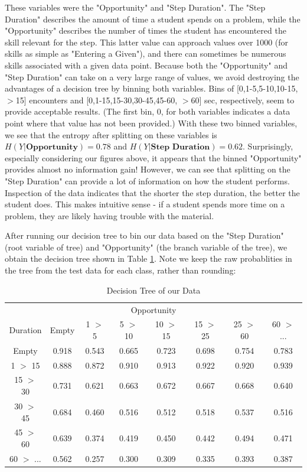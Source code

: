 \documentclass{article} %
\begin{document}
These variables were the "Opportunity" and "Step Duration". The "Step Duration" describes the amount of time a student spends on a problem, while the "Opportunity" describes the number of times the student has encountered the skill relevant for the step. This latter value can approach values over 1000 (for skills as simple as "Entering a Given"), and there can sometimes be numerous skills associated with a given data point. Because both the "Opportunity" and "Step Duration" can take on a very large range of values, we avoid destroying the advantages of a decision tree by binning both variables. Bins of [0,1-5,5-10,10-15,$>$15] encounters and [0,1-15,15-30,30-45,45-60, $>$60] sec, respectively, seem to provide acceptable results. (The first bin, 0, for both variables indicates a data point where that value has not been provided.) With these two binned variables, we see that the entropy after splitting on these variables is $H(Y|\textbf{Opportunity}) = 0.78$ and $H(Y|\textbf{Step Duration}) = 0.62$. Surprisingly, especially considering our figures above, it appears that the binned "Opportunity" provides almost no information gain! However, we can see that splitting on the "Step Duration" can provide a lot of information on how the student performs. Inspection of the data indicates that the shorter the step duration, the better the student does. This makes intuitive sense - if a student spends more time on a problem, they are likely having trouble with the material.

After running our decision tree to bin our data based on the "Step Duration" (root variable of tree) and "Opportunity" (the branch variable of the tree), we obtain the decision tree shown in Table \ref{dtree}. Note we keep the raw probablities in the tree from the test data for each class, rather than rounding:


\begin{table}[t]
\begin{center}
\begin{tabular}{c|c|c|c|c|c|c|c}
\multicolumn{8}{c}{Opportunity}\\
Duration & Empty & 1 $>$ 5 & 5 $>$ 10 & 10 $>$ 15 & 15 $>$ 25 & 25 $>$ 60 & 60 $>$ ...\\
\hline
Empty & 0.918 & 0.543 & 0.665 & 0.723 & 0.698 & 0.754 & 0.783\\
1 $>$ 15 & 0.888 & 0.872 & 0.910 & 0.913 & 0.922 & 0.920 & 0.939\\
15 $>$ 30 & 0.731 & 0.621 & 0.663 & 0.672 & 0.667 & 0.668 & 0.640\\
30 $>$ 45 & 0.684 & 0.460 & 0.516 & 0.512 & 0.518 & 0.537 & 0.516\\
45 $>$ 60 & 0.639 & 0.374 & 0.419 & 0.450 & 0.442 & 0.494 & 0.471\\
60 $>$ ... & 0.562 & 0.257 & 0.300 & 0.309 & 0.335 & 0.393 & 0.387\\
\end{tabular}
\end{center}
\caption{Decision Tree of our Data}\label{dtree}
\end{table}
\end{document}
